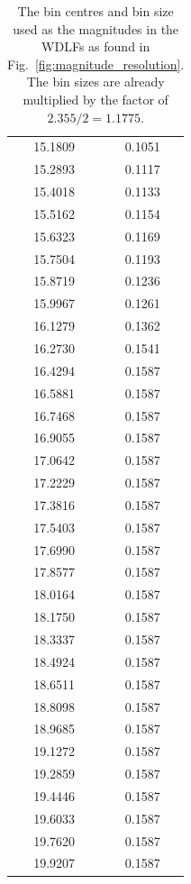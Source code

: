 \documentclass[fleqn,usenatbib]{mnras}
\begin{document}
\begin{table}
\begin{tabular}{c|c}
        15.1809 & 0.1051\\
        15.2893 & 0.1117\\
        15.4018 & 0.1133\\\hline
        15.5162 & 0.1154\\
        15.6323 & 0.1169\\
        15.7504 & 0.1193\\
        15.8719 & 0.1236\\
        15.9967 & 0.1261\\
        16.1279 & 0.1362\\
        16.2730 & 0.1541\\
        16.4294 & 0.1587\\
        16.5881 & 0.1587\\
        16.7468 & 0.1587\\\hline
        16.9055 & 0.1587\\
        17.0642 & 0.1587\\
        17.2229 & 0.1587\\
        17.3816 & 0.1587\\
        17.5403 & 0.1587\\
        17.6990 & 0.1587\\
        17.8577 & 0.1587\\
        18.0164 & 0.1587\\
        18.1750 & 0.1587\\
        18.3337 & 0.1587\\\hline
        18.4924 & 0.1587\\
        18.6511 & 0.1587\\
        18.8098 & 0.1587\\
        18.9685 & 0.1587\\
        19.1272 & 0.1587\\
        19.2859 & 0.1587\\
        19.4446 & 0.1587\\
        19.6033 & 0.1587\\
        19.7620 & 0.1587\\
        19.9207 & 0.1587\\\hline
            \end{tabular}
    \caption{The bin centres and bin size used as the magnitudes in the WDLFs as found in Fig.~\ref{fig:magnitude_resolution}. The bin sizes are already multiplied by the factor of $2.355 /2 = 1.1775$.}
    \label{tab:magnitude_resolution}
\end{table}
\end{document}

